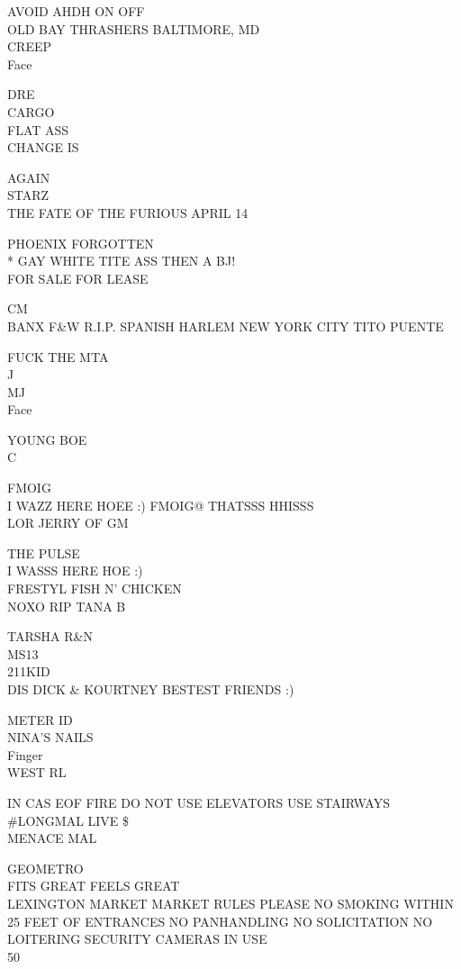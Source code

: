\documentclass[10pt,letterpaper]{article}
\begin{document}
AVOID AHDH ON OFF\\
OLD BAY THRASHERS BALTIMORE, MD\\
CREEP\\
Face

DRE\\
CARGO\\
FLAT ASS\\
CHANGE IS

AGAIN\\
STARZ\\
THE FATE OF THE FURIOUS APRIL 14

PHOENIX FORGOTTEN\\
* GAY WHITE TITE ASS THEN A BJ!\\
FOR SALE FOR LEASE

CM\\
BANX F\&W R.I.P. SPANISH HARLEM NEW YORK CITY TITO PUENTE

FUCK THE MTA\\
J\\
MJ\\
Face

YOUNG BOE\\
C

FMOIG\\
I WAZZ HERE HOEE :) FMOIG@ THATSSS HHISSS\\
LOR JERRY OF GM

THE PULSE\\
I WASSS HERE HOE :)\\
FRESTYL FISH N' CHICKEN\\
NOXO RIP TANA B

TARSHA R\&N\\
MS13\\
211KID\\
DIS DICK \& KOURTNEY BESTEST FRIENDS :)

METER ID\\
NINA'S NAILS\\
Finger\\
WEST RL

IN CAS EOF FIRE DO NOT USE ELEVATORS USE STAIRWAYS\\
\#LONGMAL LIVE \$\\
MENACE MAL

GEOMETRO\\
FITS GREAT FEELS GREAT\\
LEXINGTON MARKET MARKET RULES PLEASE NO SMOKING WITHIN 25 FEET OF ENTRANCES NO PANHANDLING NO SOLICITATION NO LOITERING SECURITY CAMERAS IN USE\\
50
\end{document}
